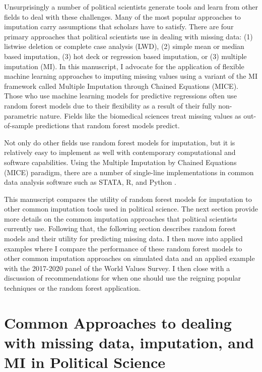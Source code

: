 \documentclass [12pt]{article}
\begin{document}
Unsurprisingly a number of political scientists generate tools and learn from other fields to deal with these challenges. Many of the most popular approaches to imputation carry assumptions that scholars have to satisfy. There are four primary approaches that political scientists use in dealing with missing data: (1) listwise deletion or complete case analysis (LWD), (2) simple mean or median based imputation, (3) hot deck or regression based imputation, or (3) multiple imputation (MI). In this manuscript, I advocate for the application of flexible machine learning approaches to imputing missing values using a variant of the MI framework called Multiple Imputation through Chained Equations (MICE). Those who use machine learning models for predictive regressions often use random forest models due to their flexibility as a result of their fully non-parametric nature. Fields like the biomedical sciences treat missing values as out-of-sample predictions that random forest models predict. 

Not only do other fields use random forest models for imputation, but it is relatively easy to implement as well with contemporary computational and software capabilities. Using the Multiple Imputation by Chained Equations (MICE) paradigm, there are a number of single-line implementations in common data analysis software such as STATA, R, and Python \citep[see][]{buuren_goothuis-oudshoorn_2011}. 

This manuscript compares the utility of random forest models for imputation to other common imputation tools used in political science. The next section provide more details on the common imputation approaches that political scientists currently use. Following that, the following section describes random forest models and their utility for predicting missing data. I then move into applied examples where I compare the performance of these random forest models to other common imputation approaches on simulated data and an applied example with the 2017-2020 panel of the World Values Survey. I then close with a discussion of recommendations for when one should use the reigning popular techniques or the random forest application. 

\section{Common Approaches to dealing with missing data, imputation, and MI in Political Science}
\end{document}
